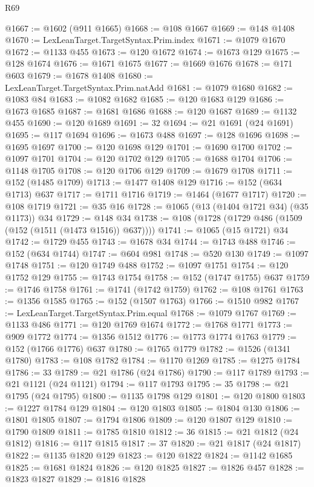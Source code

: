 \begin{lexlean}{R69}
\begin{coremodule}
@1667 := @1602 (@911 @1665)
@1668 := @108 @1667
@1669 := @148 @1408
@1670 := LexLeanTarget.TargetSyntax.Prim.index
@1671 := @1079 @1670
@1672 := @1133 @455
@1673 := @120 @1672
@1674 := @1673 @129
@1675 := @128 @1674
@1676 := @1671 @1675
@1677 := @1669 @1676
@1678 := @171 @603
@1679 := @1678 @1408
@1680 := LexLeanTarget.TargetSyntax.Prim.natAdd
@1681 := @1079 @1680
@1682 := @1083 @84
@1683 := @1082 @1682
@1685 := @120 @1683 @129
@1686 := @1673 @1685
@1687 := @1681 @1686
@1688 := @120 @1687
@1689 := @1132 @455
@1690 := @120 @1689
@1691 := 32
@1694 := @21 @1691 (@24 @1691)
@1695 := @117 @1694
@1696 := @1673 @488
@1697 := @128 @1696
@1698 := @1695 @1697
@1700 := @120 @1698 @129
@1701 := @1690 @1700
@1702 := @1097 @1701
@1704 := @120 @1702 @129
@1705 := @1688 @1704
@1706 := @1148 @1705
@1708 := @120 @1706 @129
@1709 := @1679 @1708
@1711 := @152 (@1485 @1709)
@1713 := @1477 @1408 @129
@1716 := @152 (@634 @1713) @637
@1717 := @1711 @1716
@1719 := @1464 (@1677 @1717)
@1720 := @108 @1719
@1721 := @35 @16
@1728 := @1065 (@13 (@1404 @1721 @34) (@35 @1173)) @34
@1729 := @148 @34
@1738 := @108 (@1728 (@1729 @486 (@1509 (@152 (@1511 (@1473 @1516)) @637))))
@1741 := @1065 (@15 @1721) @34
@1742 := @1729 @455
@1743 := @1678 @34
@1744 := @1743 @488
@1746 := @152 (@634 @1744)
@1747 := @604 @981
@1748 := @520 @130
@1749 := @1097 @1748
@1751 := @120 @1749 @488
@1752 := @1097 @1751
@1754 := @120 @1752 @129
@1755 := @1743 @1754
@1758 := @152 (@1747 @1755) @637
@1759 := @1746 @1758
@1761 := @1741 (@1742 @1759)
@1762 := @108 @1761
@1763 := @1356 @1585
@1765 := @152 (@1507 @1763)
@1766 := @1510 @982
@1767 := LexLeanTarget.TargetSyntax.Prim.equal
@1768 := @1079 @1767
@1769 := @1133 @486
@1771 := @120 @1769 @1674
@1772 := @1768 @1771
@1773 := @909 @1772
@1774 := @1356 @1512
@1776 := @1773 @1774 @1763
@1779 := @152 (@1766 @1776) @637
@1780 := @1765 @1779
@1782 := @1526 (@1341 @1780)
@1783 := @108 @1782
@1784 := @1170 @1269
@1785 := @1275 @1784
@1786 := 33
@1789 := @21 @1786 (@24 @1786)
@1790 := @117 @1789
@1793 := @21 @1121 (@24 @1121)
@1794 := @117 @1793
@1795 := 35
@1798 := @21 @1795 (@24 @1795)
@1800 := @1135 @1798 @129
@1801 := @120 @1800
@1803 := @1227 @1784 @129
@1804 := @120 @1803
@1805 := @1804 @130
@1806 := @1801 @1805
@1807 := @1794 @1806
@1809 := @120 @1807 @129
@1810 := @1790 @1809
@1811 := @1785 @1810
@1812 := 36
@1815 := @21 @1812 (@24 @1812)
@1816 := @117 @1815
@1817 := 37
@1820 := @21 @1817 (@24 @1817)
@1822 := @1135 @1820 @129
@1823 := @120 @1822
@1824 := @1142 @1685
@1825 := @1681 @1824
@1826 := @120 @1825
@1827 := @1826 @457
@1828 := @1823 @1827
@1829 := @1816 @1828

\end{coremodule}
\end{lexlean}

